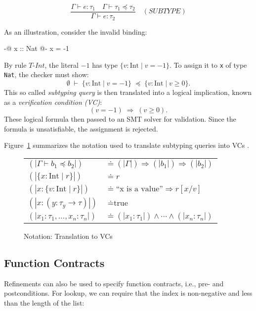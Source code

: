 \[
	\frac{ \Gamma \vdash e : \tau_1 \quad \Gamma \vdash \tau_1 \preceq \tau_2 }
	{ \Gamma \vdash e : \tau_2 }
	\quad (\mathit{SUBTYPE})
\]

As an illustration, consider the invalid binding:

\begin{code}
	{-@ x :: Nat @-}
	x = -1
\end{code}

By rule \(\mathit{T\text{-}Int}\), the literal \(-1\) has type
\(\{ v:\mathrm{Int} \mid v = -1 \}\). To assign it to \texttt{x} of type \texttt{Nat}, the
checker must show:
\[
	\emptyset \;\vdash\; \{ v:\mathrm{Int} \mid v = -1 \} \;\preceq\;
	\{ v:\mathrm{Int} \mid v \geq 0 \}.
\]
This so called \emph{subtyping query} is then translated into a logical implication, known
as a \emph{verification condition (VC)}:
\[
	(v = -1) \;\Rightarrow\; (v \geq 0).
\]
These logical formula then passed to an SMT solver for validation.
Since the formula is unsatisfiable, the assignment is rejected.

Figure~\ref{fig:notation} summarizes the notation used to translate subtyping
queries into VCs \cite{vazou2014}.
\begin{figure}[htbp]
	\centering
	\renewcommand{\arraystretch}{1.4}
	\begin{tabular}{@{}ll@{}}
		\( (|\Gamma \vdash b_1 \preceq b_2|) \) & \( \doteq (|\Gamma|) \Rightarrow (|b_1|) \Rightarrow (|b_2|) \) \\[1ex]
		\( (|\{x:\mathrm{Int} \mid r\}|) \)     & \( \doteq r \)                                                  \\[1ex]
		\( (|x:\{v:\mathrm{Int} \mid r\}|) \)   & \( \doteq \text{``x is a value''} \Rightarrow r[x/v] \)         \\[1ex]
		\( (|x:(y:\tau_y \to \tau)|) \)         & \( \doteq \text{true} \)                                        \\[1ex]
		\( (|x_1:\tau_1,\ldots,x_n:\tau_n|) \)  & \( \doteq (|x_1:\tau_1|) \land \cdots \land (|x_n:\tau_n|) \)
	\end{tabular}
	\caption{Notation: Translation to VCs \cite{vazou2014}}
	\label{fig:notation}
\end{figure}
\subsection{Function Contracts}
Refinements can also be used to specify function contracts, i.e., pre- and
postconditions. For lookup, we can require that the index is non-negative and
less than the length of the list:

